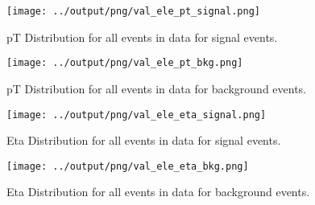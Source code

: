 \documentclass[11pt]{book}
\begin{document}
\begin{figure}[htb]
\centering
\texttt{[image: ../output/png/val\_ele\_pt\_signal.png]}
\caption{pT Distribution for all events in data for signal events.}
\label{fig:val_ele_pt_signal}
\end{figure}

\begin{figure}[htb]
\centering
\texttt{[image: ../output/png/val\_ele\_pt\_bkg.png]}
\caption{pT Distribution for all events in data for background events.}
\label{fig:val_ele_pt_bkg}
\end{figure}

\begin{figure}[htb]
\centering
\texttt{[image: ../output/png/val\_ele\_eta\_signal.png]}
\caption{Eta Distribution for all events in data for signal events.}
\label{fig:val_ele_eta_signal}
\end{figure}

\begin{figure}[htb]
\centering
\texttt{[image: ../output/png/val\_ele\_eta\_bkg.png]}
\caption{Eta Distribution for all events in data for background events.}
\label{fig:val_ele_eta_bkg}
\end{figure}
\end{document}
